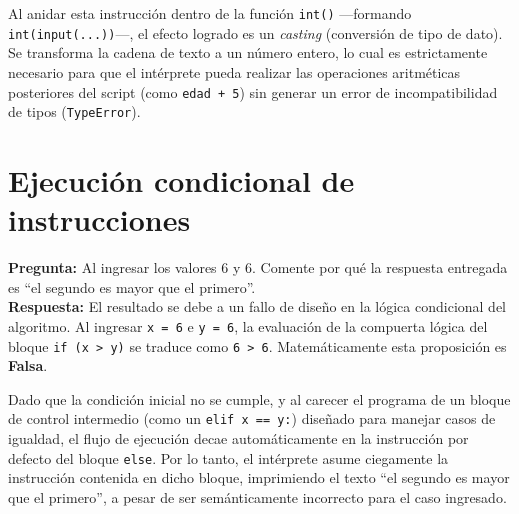 \documentclass[11pt]{article}
\begin{document}
Al anidar esta instrucción dentro de la función \texttt{int()} —formando \texttt{int(input(...))}—, el efecto logrado es un \textit{casting} (conversión de tipo de dato). Se transforma la cadena de texto a un número entero, lo cual es estrictamente necesario para que el intérprete pueda realizar las operaciones aritméticas posteriores del script (como \texttt{edad + 5}) sin generar un error de incompatibilidad de tipos (\texttt{TypeError}).

\section{Ejecución condicional de instrucciones}

\textbf{Pregunta:} Al ingresar los valores 6 y 6. Comente por qué la respuesta entregada es ``el segundo es mayor que el primero''. \\

\textbf{Respuesta:} El resultado se debe a un fallo de diseño en la lógica condicional del algoritmo. Al ingresar \texttt{x = 6} e \texttt{y = 6}, la evaluación de la compuerta lógica del bloque \texttt{if (x > y)} se traduce como \texttt{6 > 6}. Matemáticamente esta proposición es \textbf{Falsa}.

Dado que la condición inicial no se cumple, y al carecer el programa de un bloque de control intermedio (como un \texttt{elif x == y:}) diseñado para manejar casos de igualdad, el flujo de ejecución decae automáticamente en la instrucción por defecto del bloque \texttt{else}. Por lo tanto, el intérprete asume ciegamente la instrucción contenida en dicho bloque, imprimiendo el texto ``el segundo es mayor que el primero'', a pesar de ser semánticamente incorrecto para el caso ingresado.
\end{document}
